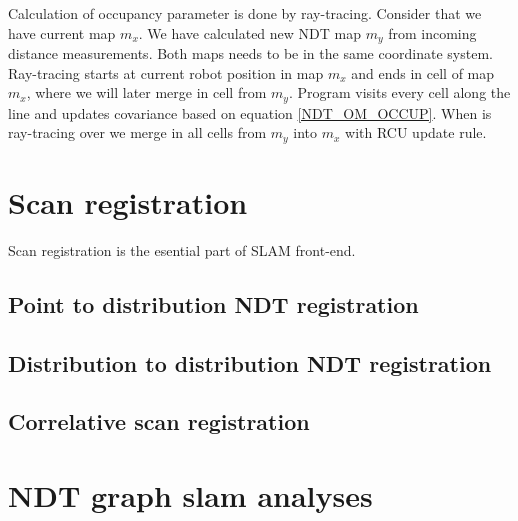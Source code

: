 Calculation of occupancy parameter is done by ray-tracing. Consider that we have current map $m_{x}$. We have calculated new NDT map $m_{y}$ from incoming distance measurements. Both maps needs to be in the same coordinate system. Ray-tracing starts at current robot position in map $m_{x}$ and ends in cell of map $m_{x}$, where we will later merge in cell from $m_{y}$. Program visits every cell along the line and updates covariance based on equation \ref{NDT_OM_OCCUP}. When is ray-tracing over we merge in all cells from $m_{y}$ into $m_{x}$ with RCU update rule.
\newpage   
\section{Scan registration}
\label{Scan_reg}
Scan registration is the esential part of SLAM front-end.
 
\subsection{Point to distribution NDT registration}
\newpage
\subsection{Distribution to distribution NDT registration}
\newpage
\subsection{Correlative scan registration}
\newpage
\section{NDT graph slam analyses}

